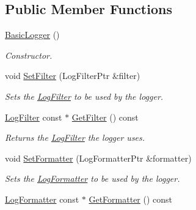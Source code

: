 \subsection*{Public Member Functions}
\begin{DoxyCompactItemize}
\item 
\hypertarget{class_common_1_1_basic_logger_ad36be68b705a5e866efb7e82edb40861}{\hyperlink{class_common_1_1_basic_logger_ad36be68b705a5e866efb7e82edb40861}{Basic\-Logger} ()}\label{class_common_1_1_basic_logger_ad36be68b705a5e866efb7e82edb40861}

\begin{DoxyCompactList}\small\item\em Constructor. \end{DoxyCompactList}\item 
\hypertarget{class_common_1_1_basic_logger_a70a3db86ad742d5f444722825b8fb8cc}{void \hyperlink{class_common_1_1_basic_logger_a70a3db86ad742d5f444722825b8fb8cc}{Set\-Filter} (Log\-Filter\-Ptr \&filter)}\label{class_common_1_1_basic_logger_a70a3db86ad742d5f444722825b8fb8cc}

\begin{DoxyCompactList}\small\item\em Sets the \hyperlink{class_common_1_1_log_filter}{Log\-Filter} to be used by the logger. \end{DoxyCompactList}\item 
\hypertarget{class_common_1_1_basic_logger_ab65a233cdf5b7bb8c1e4f4c031207d92}{\hyperlink{class_common_1_1_log_filter}{Log\-Filter} const $\ast$ \hyperlink{class_common_1_1_basic_logger_ab65a233cdf5b7bb8c1e4f4c031207d92}{Get\-Filter} () const }\label{class_common_1_1_basic_logger_ab65a233cdf5b7bb8c1e4f4c031207d92}

\begin{DoxyCompactList}\small\item\em Returns the \hyperlink{class_common_1_1_log_filter}{Log\-Filter} the logger uses. \end{DoxyCompactList}\item 
\hypertarget{class_common_1_1_basic_logger_ab5fd74a36a2c1ac3147c60cb1baf94f2}{void \hyperlink{class_common_1_1_basic_logger_ab5fd74a36a2c1ac3147c60cb1baf94f2}{Set\-Formatter} (Log\-Formatter\-Ptr \&formatter)}\label{class_common_1_1_basic_logger_ab5fd74a36a2c1ac3147c60cb1baf94f2}

\begin{DoxyCompactList}\small\item\em Sets the \hyperlink{class_common_1_1_log_formatter}{Log\-Formatter} to be used by the logger. \end{DoxyCompactList}\item 
\hypertarget{class_common_1_1_basic_logger_a682266d982b8b8b10958dbbfbdaa40bc}{\hyperlink{class_common_1_1_log_formatter}{Log\-Formatter} const $\ast$ \hyperlink{class_common_1_1_basic_logger_a682266d982b8b8b10958dbbfbdaa40bc}{Get\-Formatter} () const }\label{class_common_1_1_basic_logger_a682266d982b8b8b10958dbbfbdaa40bc}


\end{DoxyCompactItemize}
